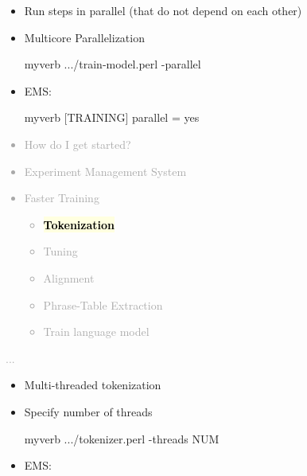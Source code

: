 \documentclass[landscape]{uedslides2C}
\newcommand{\currenttopic}[1]{\colorbox{lightyellow}{\textcolor{black}{\bf #1}}}
\begin{document}
\begin{itemize} \itemsep 10mm
\vspace{10mm}
\item Run steps in parallel (that do not depend on each other)

\item {Multicore Parallelization}\\[4mm]
\begin{SaveVerbatim}{myverb} 
  .../train-model.perl -parallel
\end{SaveVerbatim}
\colorbox{gray}{}

\item EMS: \\[4mm]
\begin{SaveVerbatim}{myverb} 
  [TRAINING]
  parallel = yes
\end{SaveVerbatim}
\colorbox{gray}{}


\end{itemize}


\vspace{-5mm}
\textcolor{darkgrey}{
\begin{itemize} \itemsep -1mm
\item {How do I get started?}
\item {Experiment Management System}
\item {Faster Training}
  \begin{itemize}
  \item \currenttopic{Tokenization}
  \item Tuning
  \item Alignment
  \item Phrase-Table Extraction
  \item Train language model
  \end{itemize}
\end{itemize}
...
}



\begin{itemize} \itemsep 10mm

\item Multi-threaded tokenization

\item {Specify number of threads}\\[4mm]
\begin{SaveVerbatim}{myverb} 
 .../tokenizer.perl -threads NUM
\end{SaveVerbatim}
\colorbox{gray}{}

\item EMS: \\[4mm]
\colorbox{gray}{}
  
  
\end{itemize}
\end{document}
